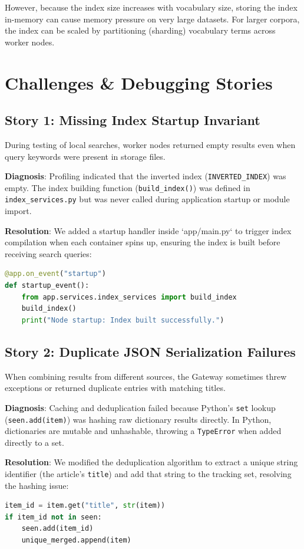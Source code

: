 \documentclass[11pt,a4paper]{article}
\begin{document}
\begin{itemize}
However, because the index size increases with vocabulary size, storing the index in-memory can cause memory pressure on very large datasets. For larger corpora, the index can be scaled by partitioning (sharding) vocabulary terms across worker nodes.

\section{Challenges \& Debugging Stories}

\subsection{Story 1: Missing Index Startup Invariant}
During testing of local searches, worker nodes returned empty results even when query keywords were present in storage files.

\textbf{Diagnosis}: Profiling indicated that the inverted index (\texttt{INVERTED\_INDEX}) was empty. The index building function (\texttt{build\_index()}) was defined in \texttt{index\_services.py} but was never called during application startup or module import.

\textbf{Resolution}: We added a startup handler inside `app/main.py` to trigger index compilation when each container spins up, ensuring the index is built before receiving search queries:
\begin{lstlisting}[language=Python]
@app.on_event("startup")
def startup_event():
    from app.services.index_services import build_index
    build_index()
    print("Node startup: Index built successfully.")
\end{lstlisting}

\subsection{Story 2: Duplicate JSON Serialization Failures}
When combining results from different sources, the Gateway sometimes threw exceptions or returned duplicate entries with matching titles.

\textbf{Diagnosis}: Caching and deduplication failed because Python's \texttt{set} lookup (\texttt{seen.add(item)}) was hashing raw dictionary results directly. In Python, dictionaries are mutable and unhashable, throwing a \texttt{TypeError} when added directly to a set.

\textbf{Resolution}: We modified the deduplication algorithm to extract a unique string identifier (the article's \texttt{title}) and add that string to the tracking set, resolving the hashing issue:
\begin{lstlisting}[language=Python]
item_id = item.get("title", str(item))
if item_id not in seen:
    seen.add(item_id)
    unique_merged.append(item)
\end{lstlisting}


\end{itemize}
\end{document}
